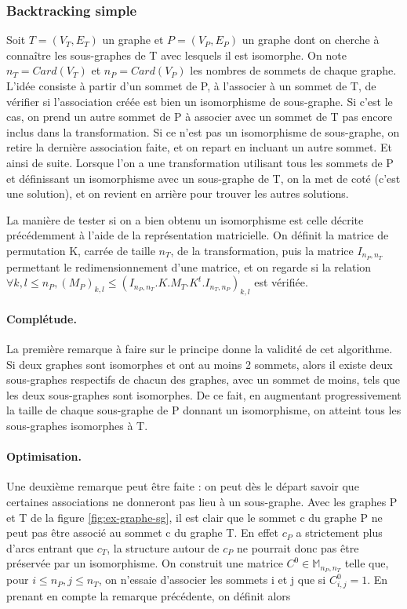 \subsubsection{Backtracking simple}
Soit $T=(V_T, E_T)$ un graphe et $P=(V_P, E_P)$ un graphe dont on cherche à connaître les sous-graphes de T avec lesquels il est isomorphe.
On note $n_T=Card(V_T)$ et $n_P=Card(V_P)$ les nombres de sommets de chaque graphe.
L'idée consiste à partir d'un sommet de P, à l'associer à un sommet de T, de vérifier si l'association créée est bien un
isomorphisme de sous-graphe. 
Si c'est le cas, on prend un autre sommet de P à associer avec un sommet de T pas encore
inclus dans la transformation. 
Si ce n'est pas un isomorphisme de sous-graphe, on retire la dernière association faite, et on repart en incluant un autre sommet. 
Et ainsi de suite. Lorsque l'on a une transformation utilisant tous les sommets de P et définissant un isomorphisme avec un sous-graphe de T, on la met de coté (c'est une solution), et on revient en arrière pour trouver les autres solutions.


La manière de tester si on a bien obtenu un isomorphisme est celle décrite précédemment à l'aide de la représentation matricielle.
On définit la matrice de permutation K, carrée de taille $n_T$, de la transformation,
puis la matrice $I_{n_P, n_T}$ permettant le redimensionnement d'une matrice, et on regarde si la relation $\forall k,l\leq n_P, (M_P)_{k,l}\leq (I_{n_P, n_T}.K.M_T.K^t.I_{n_T, n_P})_{k,l}$ est
vérifiée.
\\

\paragraph{Complétude.}
La première remarque à faire sur le principe donne la validité de cet algorithme. Si deux graphes sont isomorphes et ont au moins 2 sommets,
alors il existe deux sous-graphes respectifs de chacun des graphes, avec un sommet de moins, tels que les deux sous-graphes sont isomorphes.
De ce fait, en augmentant progressivement la taille de chaque sous-graphe de P donnant un isomorphisme, on atteint tous les sous-graphes isomorphes à T.


\paragraph{Optimisation.}
Une deuxième remarque peut être faite : on peut dès le départ savoir que certaines associations ne donneront pas lieu à un sous-graphe. Avec les graphes P et T
de la figure \ref{fig:ex-graphe-sg}, il est clair que le sommet c du graphe P ne peut pas être associé au sommet c du graphe T. En effet $c_P$ a strictement plus d'arcs
entrant que $c_T$, la structure autour de $c_P$ ne pourrait donc pas être préservée par un isomorphisme. On construit une matrice $C^0 \in \mathbb{M}_{n_P, n_T}$ telle que, pour
$i\le n_P, j\le n_T$, on n'essaie d'associer les sommets i et j que si $C^0_{i, j}=1$. En prenant en compte la remarque précédente, on définit alors
\\

